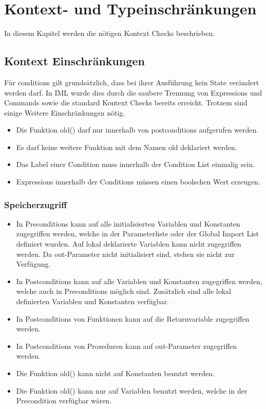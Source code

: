 \section{Kontext- und Typeinschränkungen}
\label{sec:constraints}
In diesem Kapitel werden die nötigen Kontext Checks beschrieben.

\subsection{Kontext Einschränkungen}

Für conditions gilt grundsätzlich, dass bei ihrer Ausführung kein State verändert werden 
darf. In IML wurde dies durch die saubere Trennung von Expressions und Commands sowie die standard
Kontext Checks bereits erreicht. Trotzem sind einige Weitere Einschränkungen nötig.

\begin{itemize}

\item Die Funktion old() darf nur innerhalb von postconditions aufgerufen werden.
\item Es darf keine weitere Funktion mit dem Namen old deklariert werden.
\item Das Label einer Condition muss innerhalb der Condition List einmalig sein.
\item Expressions innerhalb der Conditions müssen einen boolschen Wert erzeugen.

\end{itemize}

\subsubsection{Speicherzugriff}

\begin{itemize}
\item In Preconditions kann auf alle initialisierten Variablen und Konstanten zugegriffen werden, welche 
in der Parameterliste oder der Global Import List definiert wurden. Auf lokal deklarierte Variablen 
kann nicht zugegriffen werden. Da out-Parameter nicht initialisiert sind, stehen sie nicht zur
Verfügung.
\item In Postconditions kann auf alle Variablen und Konstanten zugegriffen werden, welche auch in 
Preconditions möglich sind. Zusätzlich sind alle lokal definierten Variablen und Konstanten verfügbar.
\item In Postconditions von Funktionen kann auf die Returnvariable zugegriffen werden.
\item In Postconditions von Prozeduren kann auf out-Parameter zugegriffen werden.
\item Die Funktion old() kann nicht auf Konstanten benutzt werden.
\item Die Funktion old() kann nur auf Variablen benutzt werden, welche in der Precondition verfügbar wären.

\end{itemize}




